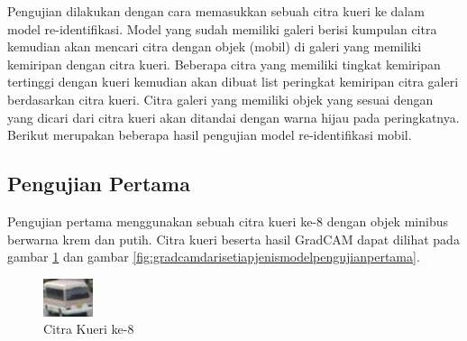 Pengujian dilakukan dengan cara memasukkan sebuah citra kueri ke dalam model re-identifikasi. Model yang sudah memiliki 
galeri berisi kumpulan citra kemudian akan mencari citra dengan objek (mobil) di galeri yang memiliki kemiripan dengan citra 
kueri. Beberapa citra yang memiliki tingkat kemiripan tertinggi dengan kueri kemudian akan dibuat list peringkat 
kemiripan citra galeri berdasarkan citra kueri. Citra galeri yang memiliki objek yang sesuai dengan yang dicari dari citra 
kueri akan ditandai dengan warna hijau pada peringkatnya. Berikut merupakan beberapa hasil pengujian model re-identifikasi mobil.

\subsection{Pengujian Pertama}

Pengujian pertama menggunakan sebuah citra kueri ke-8 dengan objek minibus \linebreak berwarna krem dan putih. Citra kueri 
beserta hasil GradCAM dapat dilihat pada gambar \ref{fig:gambarkueriuntukpengujianpertama} dan gambar 
\ref{fig:gradcamdarisetiapjenismodelpengujianpertama}.

\begin{figure}[h!]
  \centering
  \includegraphics[scale=1]{gambar/Que8_1018.jpg}
  \caption{Citra Kueri ke-8}
  \label{fig:gambarkueriuntukpengujianpertama}
\end{figure}

